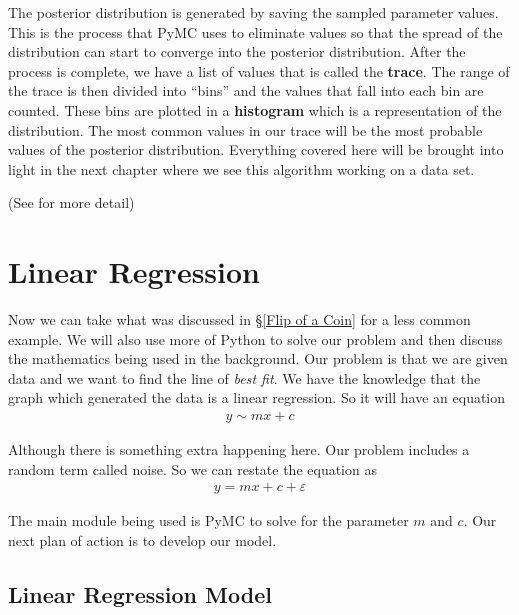 \documentclass[12pt,twoside]{report}   %
\begin{document}
The posterior distribution is generated by saving the sampled parameter values. This is the process that PyMC uses to eliminate values so that the spread of the distribution can start to converge into the posterior distribution. After the process is complete, we have a list of values that is called the \textbf{trace}. The range of the trace is then divided into ``bins'' and the values that fall into each bin are counted. These bins are plotted in a \textbf{histogram} which is a representation of the distribution. The most common values in our trace will be the most probable values of the posterior distribution. Everything covered here will be brought into light in the next chapter where we see this algorithm working on a data set.

(See \cite{2} for more detail)

\chapter{Linear Regression}\label{Linear Example}

Now we can take what was discussed in \S\ref{Flip of a Coin} for a less common example. We will also use more of Python to solve our problem and then discuss the mathematics being used in the background. Our problem is that we are given data and we want to find the line of \textit{best fit}. We have the knowledge that the graph which generated the data is a linear regression. So it will have an equation
\begin{align*}
y \sim mx + c
\end{align*}

Although there is something extra happening here. Our problem includes a random term called noise. So we can restate the equation as
\begin{align*}
y = mx + c + \varepsilon
\end{align*}

The main module being used is PyMC to solve for the parameter $m$ and $c$. Our next plan of action is to develop our model.

\section{Linear Regression Model}\label{The Model2}
\end{document}
